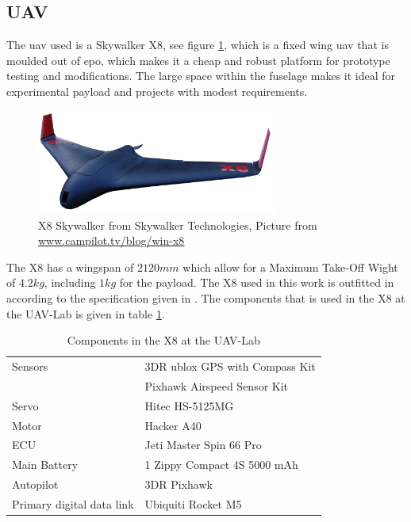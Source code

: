 \subsection{UAV}\label{ss:SkywalkerX8}
The \gls{uav} used is a Skywalker X8, see figure \ref{figure:skywalkerX8}, which is a fixed wing \acrfull{uav} that is moulded out of \gls{epo}, which makes it a cheap and robust platform for prototype testing and modifications. The large space within the fuselage makes it ideal for experimental payload and projects with modest requirements.
\begin{figure}[H]
	\centering
		\includegraphics[width=0.7\textwidth]{figs/Wing-X8_white-bgd2.png}
		\caption{X8 Skywalker from Skywalker Technologies, Picture from \url{www.campilot.tv/blog/win-x8}}
		\label{figure:skywalkerX8}
\end{figure}
The X8 has a wingspan of $2120mm$ which allow for a Maximum Take-Off Wight of $4.2kg$, including $1kg$ for the payload. The X8 used in this work is outfitted in according to the specification given in \citep{KlausenX8}. The components that is used in the X8 at the UAV-Lab is given in table \ref{tb:X8Components}.
\begin{table}[H]
\begin{center}
\begin{tabular}{l l}
Sensors & 3DR ublox GPS with Compass Kit\\&Pixhawk Airspeed Sensor Kit \\
Servo & Hitec HS-5125MG \\
Motor & Hacker A40 \\
ECU & Jeti Master Spin 66 Pro \\
Main Battery & 1 Zippy Compact 4S 5000 mAh\\
Autopilot & 3DR Pixhawk \\
Primary digital data link & Ubiquiti Rocket M5
\end{tabular}
\end{center}
\caption{Components in the X8 at the UAV-Lab}
\label{tb:X8Components}
\end{table}
